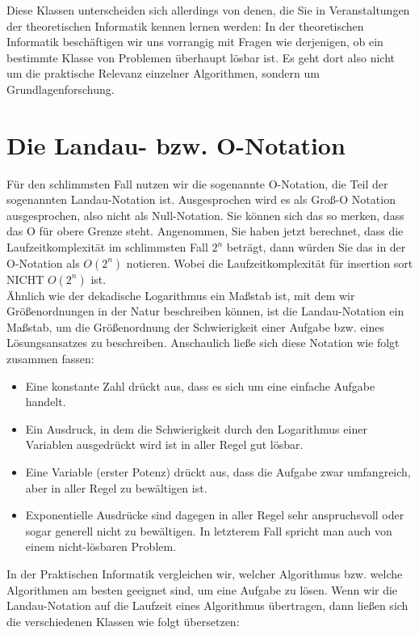Diese Klassen unterscheiden sich allerdings von denen, die Sie in Veranstaltungen der theoretischen Informatik kennen lernen werden: In der theoretischen Informatik beschäftigen wir uns vorrangig mit Fragen wie derjenigen, ob ein bestimmte Klasse von Problemen überhaupt lösbar ist. Es geht dort also nicht um die praktische Relevanz einzelner Algorithmen, sondern um Grundlagenforschung. 

\section{Die Landau- bzw. O-Notation}

Für den schlimmsten Fall nutzen wir die sogenannte O-Notation, die Teil der sogenannten Landau-Notation ist. Ausgesprochen wird es als Groß-O Notation ausgesprochen, also nicht als Null-Notation. Sie können sich das so merken, dass das O für obere Grenze steht. Angenommen, Sie haben jetzt berechnet, dass die Laufzeitkomplexität im schlimmsten Fall \(2^n\) beträgt, dann würden Sie das in der O-Notation als \(O(2^n)\) notieren. Wobei die Laufzeitkomplexität für insertion sort NICHT \(O(2^n)\) ist.\\

Ähnlich wie der dekadische Logarithmus ein Maßstab ist, mit dem wir Größenordnungen in der Natur beschreiben können, ist die Landau-Notation ein Maßstab, um die Größenordnung der Schwierigkeit einer Aufgabe bzw. eines Lösungsansatzes zu beschreiben. Anschaulich ließe sich diese Notation wie folgt zusammen fassen:

\begin{itemize}
	\item Eine konstante Zahl drückt aus, dass es sich um eine einfache Aufgabe handelt.
	\item Ein Ausdruck, in dem die Schwierigkeit durch den Logarithmus einer Variablen ausgedrückt wird ist in aller Regel gut lösbar.
	\item Eine Variable (erster Potenz) drückt aus, dass die Aufgabe zwar umfangreich, aber in aller Regel zu bewältigen ist.
	\item Exponentielle Ausdrücke sind dagegen in aller Regel sehr anspruchsvoll oder sogar generell nicht zu bewältigen. In letzterem Fall spricht man auch von einem nicht-lösbaren Problem.
\end{itemize}

In der Praktischen Informatik vergleichen wir, welcher Algorithmus bzw. welche Algorithmen am besten geeignet sind, um eine Aufgabe zu lösen. Wenn wir die Landau-Notation auf die Laufzeit eines Algorithmus übertragen, dann ließen sich die verschiedenen Klassen wie folgt übersetzen:

